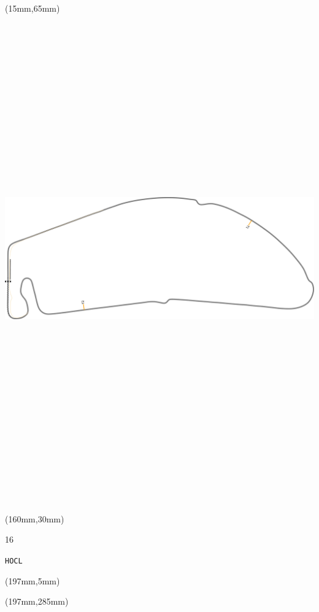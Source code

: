 \begin{textblock*}{185mm}(15mm,65mm)%
\centering
\mbox{\includegraphics[width=185mm,height=210mm,keepaspectratio]{PT/HOCL.pdf}}
\end{textblock*}
\begin{textblock*}{40mm}(160mm,30mm)%
\Large
\par{} 
\par16 
\par\hfill\tiny\tt HOCL\\
\end{textblock*}
\begin{textblock*}{20mm}(197mm,5mm)%
\fbox{\thepage}
\label{HOCL}
\end{textblock*}
\begin{textblock*}{20mm}(197mm,285mm)%
\fbox{\thepage}
\end{textblock*}

